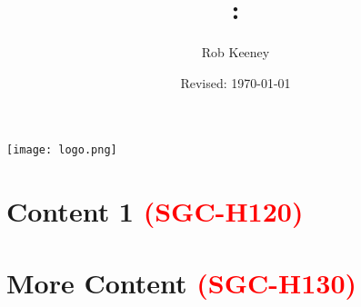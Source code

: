 \documentclass[addpoints,12pt,answers]{exam} %
\title{\theSchool : \docTitle}
\author{Rob Keeney}
\date{Revised: \today}
\newcommand{\MainPath}{C:/Main\space Document\space Path/}
\newcommand{\ResourcePath}{\MainPath Resources/}
\begin{document}

    \makeatletter
    \makeatother

    \pointsinrightmargin
    \maketitle
    \begin{center} %
        \texttt{[image: logo.png]}
    \end{center}
    \clearpage
    \tableofcontents
    \clearpage


    \section[Handout 1]{Content 1 \textcolor{red}{(SGC-H120)}}
    \label{sec:content1}

    \section[Handout 2]{More Content \textcolor{red}{(SGC-H130)}}
    \label{sec:content2}

\end{document}

